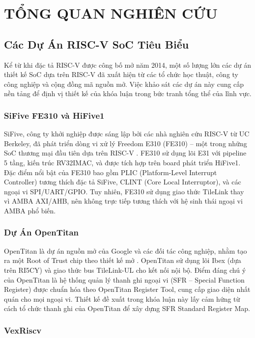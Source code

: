 \chapter{TỔNG QUAN NGHIÊN CỨU}
\label{Chapter2}

\section{Các Dự Án RISC-V SoC Tiêu Biểu}

Kể từ khi đặc tả RISC-V được công bố mở năm 2014, một số lượng lớn các dự án thiết kế SoC dựa trên RISC-V đã xuất hiện từ các tổ chức học thuật, công ty công nghiệp và cộng đồng mã nguồn mở. Việc khảo sát các dự án này cung cấp nền tảng để định vị thiết kế của khóa luận trong bức tranh tổng thể của lĩnh vực.

\subsection{SiFive FE310 và HiFive1}

SiFive, công ty khởi nghiệp được sáng lập bởi các nhà nghiên cứu RISC-V từ UC Berkeley, đã phát triển dòng vi xử lý Freedom E310 (FE310) -- một trong những SoC thương mại đầu tiên dựa trên RISC-V \cite{sifive-fe310}. FE310 sử dụng lõi E31 với pipeline 5 tầng, kiến trúc RV32IMAC, và được tích hợp trên board phát triển HiFive1. Đặc điểm nổi bật của FE310 bao gồm PLIC (Platform-Level Interrupt Controller) tương thích đặc tả SiFive, CLINT (Core Local Interruptor), và các ngoại vi SPI/UART/GPIO. Tuy nhiên, FE310 sử dụng giao thức TileLink thay vì AMBA AXI/AHB, nên không trực tiếp tương thích với hệ sinh thái ngoại vi AMBA phổ biến.

\subsection{Dự Án OpenTitan}

OpenTitan là dự án nguồn mở của Google và các đối tác công nghiệp, nhằm tạo ra một Root of Trust chip theo thiết kế mở \cite{opentitan}. OpenTitan sử dụng lõi Ibex (dựa trên RI5CY) và giao thức bus TileLink-UL cho kết nối nội bộ. Điểm đáng chú ý của OpenTitan là hệ thống quản lý thanh ghi ngoại vi (SFR -- Special Function Register) được chuẩn hóa theo OpenTitan Register Tool, cung cấp giao diện nhất quán cho mọi ngoại vi. Thiết kế đề xuất trong khóa luận này lấy cảm hứng từ cách tổ chức thanh ghi của OpenTitan để xây dựng SFR Standard Register Map.

\subsection{VexRiscv}

